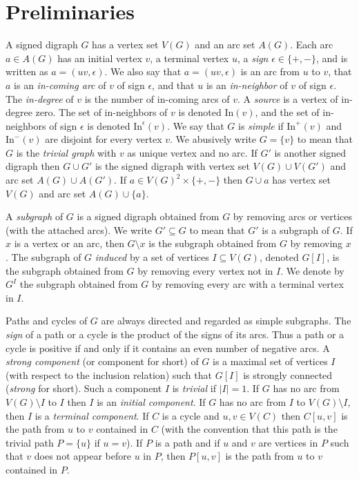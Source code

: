 \documentclass[11pt,a4paper]{article}
\def\In{\mathrm{In}}
\def\e{\epsilon}
\begin{document}
\section{Preliminaries}\label{sec:preliminaries}


A signed digraph $G$ has a vertex set $V(G)$ and an arc set $A(G)$. Each arc $a\in A(G)$ has an initial vertex $v$, a terminal vertex $u$, a {\em sign} $\e\in\{+,-\}$, and is written as $a=(uv,\e)$. We also say that $a=(uv,\e)$ is an arc from $u$ to $v$, that $a$ is an {\em in-coming arc} of $v$ of sign $\e$, and that $u$ is an {\em in-neighbor} of $v$ of sign $\e$. The {\em in-degree} of $v$ is the number of in-coming arcs of $v$. A {\em source} is a vertex of in-degree zero. The set of in-neighbors of $v$ is denoted $\In(v)$, and the set of in-neighbors of sign $\e$ is denoted $\In^\e(v)$. We say that $G$ is {\em simple} if $\In^+(v)$ and $\In^-(v)$ are disjoint for every vertex $v$. We abusively write $G=\{v\}$ to mean that $G$ is the {\em trivial graph} with $v$ as unique vertex and no arc. If $G'$ is another signed digraph then $G\cup G'$ is the signed digraph with vertex set $V(G)\cup V(G')$ and arc set $A(G)\cup A(G')$. If $a\in V(G)^2\times \{+,-\}$ then $G\cup a$ has vertex set $V(G)$ and arc set $A(G)\cup\{a\}$. 

\medskip
A {\em subgraph} of $G$ is a signed digraph obtained from $G$ by removing arcs or vertices (with the attached arcs). We write $G'\subseteq G$ to mean that $G'$ is a subgraph of $G$. If $x$ is a vertex or an arc, then $G\setminus x$ is the subgraph obtained from $G$ by removing $x$. The subgraph of $G$ {\em induced} by a set of vertices $I\subseteq V(G)$, denoted $G[I]$, is the subgraph obtained from $G$ by removing every vertex not in $I$. We denote by $G^I$ the subgraph obtained from $G$ by removing every arc with a terminal vertex in $I$. 

\medskip
Paths and cycles of $G$ are always directed and regarded as simple subgraphs. The {\em sign} of a path or a cycle is the product of the signs of its arcs. Thus a path or a cycle is positive if and only if it contains an even number of negative arcs. A {\em strong component} (or component for short) of $G$ is a maximal set of vertices $I$ (with respect to the inclusion relation) such that $G[I]$ is strongly connected ({\em strong} for short). Such a component $I$ is {\em trivial} if $|I|=1$. If $G$ has no arc from $V(G)\setminus I$ to $I$ then $I$ is an {\em initial component}. If $G$ has no arc from $I$ to $V(G)\setminus I$, then $I$ is a {\em terminal component}. If $C$ is a cycle and $u,v\in V(C)$ then $C[u,v]$ is the path from $u$ to $v$ contained in $C$ (with the convention that this path is the trivial path $P=\{u\}$ if $u=v$). If $P$ is a path and if $u$ and $v$ are vertices in $P$ such that $v$ does not appear before $u$ in $P$, then $P[u,v]$ is the path from $u$ to $v$ contained in $P$.  
\end{document}
